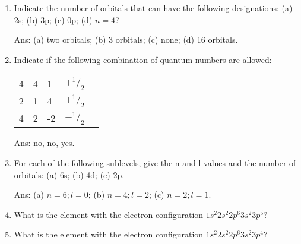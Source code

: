 \documentclass[main.tex]{subfiles}
\begin{document}
\begin{multicols*}{2}
\begin{enumerate}
\item Indicate the number of orbitals that can have the following designations: (a) 2s; (b) 3p; (c) 0p; (d) $n=4$?
  \begin{flushright}\small Ans:  (a) two orbitals; (b) 3 orbitals; (c) none; (d) 16 orbitals. \end{flushright}

\item Indicate if the following combination of quantum numbers are allowed:\\
\begin{tabularx}{\columnwidth}{>{}m{.20\linewidth} *{4}{Y} }
  \toprule
{} &   &   &  &    \\
    	&	4	&	1	&	$+^1/_2$    \\
   2	&	1&		4	&	$+^1/_2$   \\
4		&2	&	-2	&	$-^1/_2$\\    
    \bottomrule
\end{tabularx}
  \begin{flushright}\small Ans:  no, no, yes. \end{flushright}

\item For each of the following sublevels, give the n and l values and the number of orbitals: (a) 6s; (b) 4d; (c) 2p.
  \begin{flushright}\small Ans: (a) $n=6;l=0$; (b) $n=4;l=2$; (c) $n=2;l=1$. \end{flushright}

\item What is the element with the electron configuration $1s^2 2s^2 2p^6 3s^2 3p^5$?
\begin{enumerate}[label=(\alph*)]
\end{enumerate}

\item What is the element with the electron configuration $1s^2 2s^2 2p^6 3s^2 3p^4$?
\begin{enumerate}[label=(\alph*)]\begin{multicols*}{3}


\end{multicols*}
\end{enumerate}
\end{enumerate}
\end{multicols*}
\end{document}
